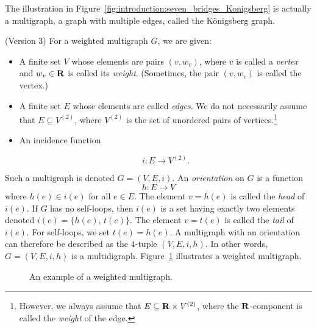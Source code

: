 The illustration in
Figure~\ref{fig:introduction:seven_bridges_Konigsberg} is actually a
multigraph, a graph with multiple edges, called the
K\"onigsberg graph.

\begin{definition} (Version 3)
\label{def:introduction:graph-version3}
\rm
For a weighted multigraph $G$, we are
given:
%
\begin{itemize}
\item A finite set $V$ whose elements are pairs $(v, w_v)$, where $v$
  is called a \emph{vertex} and $w_v \in \mathbf{R}$
  is called its \emph{weight}. (Sometimes,
  the pair $(v, w_v)$ is called the vertex.)

\item A finite set $E$ whose elements are called
  \emph{edges}. We do not necessarily assume
  that $E \subseteq V^{(2)}$, where $V^{(2)}$ is the set of unordered
  pairs of
  vertices.\footnote{
    However, we always assume that $E \subseteq \mathbf{R} \times V^{(2)}$,
    where the $\mathbf{R}$-component is called the
    \emph{weight} of the edge.
  }

\item An incidence function

\begin{equation}
\label{eqn:introduction:edge_incidence}
i: E \to V^{(2)}.
\end{equation}
\end{itemize}
Such a multigraph is denoted $G = (V,E,i)$. An
\emph{orientation} on $G$ is a function
\begin{equation}
\label{eqn:introduction:edge_orientation}
h: E \to V
\end{equation}
where $h(e) \in i(e)$ for all $e \in E$. The element $v = h(e)$ is
called the \emph{head} of $i(e)$. If $G$ has no
self-loops, then $i(e)$ is a set having exactly two elements denoted
$i(e) = \{h(e),\, t(e)\}$. The element $v = t(e)$ is called the
\emph{tail} of $i(e)$. For self-loops, we set
$t(e) = h(e)$. A multigraph with an orientation can
therefore be described as the $4$-tuple $(V, E, i, h)$. In other
words, $G = (V,E,i,h)$ is a
multidigraph. Figure~\ref{fig:introduction:weighted_multigraph}
illustrates a weighted multigraph.
\end{definition}

\begin{figure}[!htbp]
\centering

\caption{An example of a weighted multigraph.}
\label{fig:introduction:weighted_multigraph}
\end{figure}

